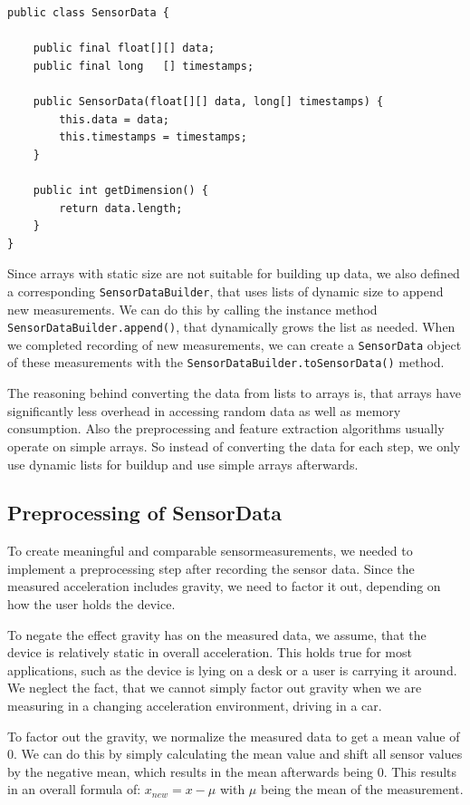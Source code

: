 \begin{lstlisting}[float,
caption={Class \lstinline$SensorData$ containing the raw sensor readings},
label={lst:sensordata}]
public class SensorData {
    
    public final float[][] data;
    public final long   [] timestamps;

    public SensorData(float[][] data, long[] timestamps) {
        this.data = data;
        this.timestamps = timestamps;
    }

    public int getDimension() {
        return data.length;
    }
}
\end{lstlisting}

Since arrays with static size are not suitable for building up data, we also defined a corresponding \lstinline$SensorDataBuilder$, that uses lists of dynamic size to append new measurements. We can do this by calling the instance method \lstinline$SensorDataBuilder.append()$, that dynamically grows the list as needed. When we completed recording of new measurements, we can create a \lstinline$SensorData$ object of these measurements with the \lstinline$SensorDataBuilder.toSensorData()$ method.

The reasoning behind converting the data from lists to arrays is, that arrays have significantly less overhead in accessing random data as well as memory consumption. Also the preprocessing and feature extraction algorithms usually operate on simple arrays. So instead of converting the data for each step, we only use dynamic lists for buildup and use simple arrays afterwards.

\subsection{Preprocessing of SensorData}
To create meaningful and comparable sensormeasurements, we needed to implement a preprocessing step after recording the sensor data. Since the measured acceleration includes gravity, we need to factor it out, depending on how the user holds the device.

To negate the effect gravity has on the measured data, we assume, that the device is relatively static in overall acceleration. This holds true for most applications, such as the device is lying on a desk or a user is carrying it around. We neglect the fact, that we cannot simply factor out gravity when we are measuring in a changing acceleration environment, \eg driving in a car.

To factor out the gravity, we normalize the measured data to get a mean value of 0. We can do this by simply calculating the mean value and shift all sensor values by the negative mean, which results in the mean afterwards being 0. This results in an overall formula of: $ x_{new} = x - \mu $ with $\mu$ being the mean of the measurement.

